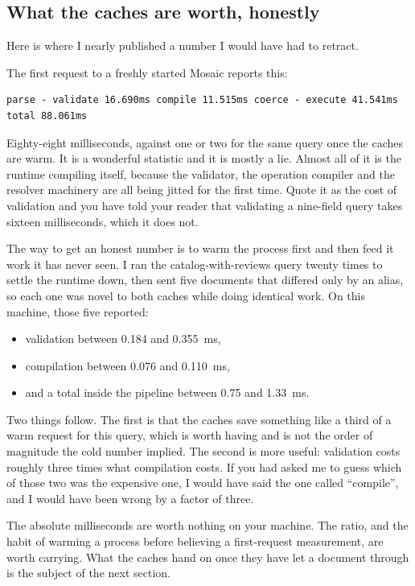 \subsection*{What the caches are worth, honestly}

%
Here is where I nearly published a number I would have had to retract.

The first request to a freshly started Mosaic reports this:

\begin{verbatim}
parse - validate 16.690ms compile 11.515ms coerce - execute 41.541ms total 88.061ms
\end{verbatim}

Eighty-eight milliseconds, against one or two for the same query once the caches
are warm. It is a wonderful statistic and it is mostly a lie. Almost all of it
is the runtime compiling itself, because the validator, the operation compiler
and the resolver machinery are all being jitted for the first time. Quote it as
the cost of validation and you have told your reader that validating a
nine-field query takes sixteen milliseconds, which it does not.

The way to get an honest number is to warm the process first and then feed it
work it has never seen. I ran the catalog-with-reviews query twenty times to
settle the runtime down, then sent five documents that differed only by an
alias, so each one was novel to both caches while doing identical work. On this
machine, those five reported:

\begin{itemize}
  \item validation between 0.184 and 0.355~ms,
  \item compilation between 0.076 and 0.110~ms,
  \item and a total inside the pipeline between 0.75 and 1.33~ms.
\end{itemize}

Two things follow. The first is that the caches save something like a third of a
warm request for this query, which is worth having and is not the order of
magnitude the cold number implied. The second is more useful: validation costs
roughly three times what compilation costs. If you had asked me to guess which
of those two was the expensive one, I would have said the one called
\enquote{compile}, and I would have been wrong by a factor of three.

The absolute milliseconds are worth nothing on your machine. The ratio, and the
habit of warming a process before believing a first-request measurement, are
worth carrying. What the caches hand on once they have let a document through is
the subject of the next section.
